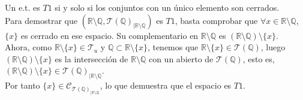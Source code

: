 \documentclass[12pt]{article}
\begin{document}
\begin{ejercicio}[2 puntos]
\begin{enumerate}[label=(\alph*)]
                Un e.t. es $T1$ si y solo si los conjuntos con un único elemento son cerrados.\\
                Para demostrar que $(\mathbb{R}\setminus\mathbb{Q}, \mathcal{T}(\mathbb{Q})_{|\mathbb{R}\setminus\mathbb{Q}})$ es $T1$, basta comprobar que $\forall x \in \mathbb{R}\setminus\mathbb{Q}$, $\{x\}$ es cerrado en ese espacio. Su complementario en $\mathbb{R}\setminus\mathbb{Q}$ es $(\mathbb{R}\setminus\mathbb{Q}) \setminus \{x\}$.\\
                Ahora, como $\mathbb{R} \setminus \{x\} \in \mathcal{T}_u$ y $\mathbb{Q} \subset \mathbb{R} \setminus \{x\}$, tenemos que $\mathbb{R} \setminus \{x\} \in \mathcal{T}(\mathbb{Q})$, luego $(\mathbb{R}\setminus\mathbb{Q}) \setminus \{x\}$ es la intersección de $\mathbb{R}\setminus\mathbb{Q}$ con un abierto de $\mathcal{T}(\mathbb{Q})$, esto es, $(\mathbb{R}\setminus\mathbb{Q}) \setminus \{x\} \in \mathcal{T}(\mathbb{Q})_{|\mathbb{R}\setminus\mathbb{Q}}$.\\
                Por tanto $\{x\} \in \mathcal{C}_{\mathcal{T}(\mathbb{Q})_{|\mathbb{R}\setminus\mathbb{Q}}}$, lo que demuestra que el espacio es $T1$.
        \end{enumerate}
    \end{ejercicio}
\end{document}
